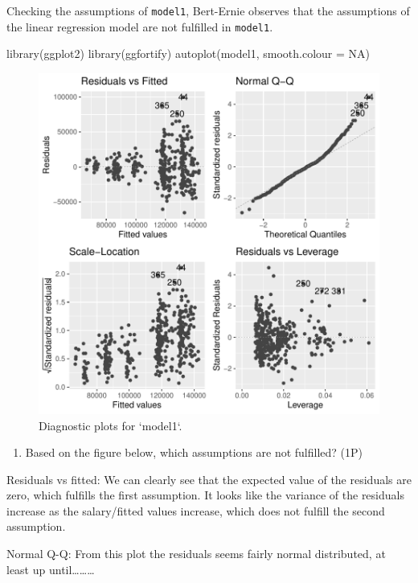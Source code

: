 \documentclass[
]{article}
\newenvironment{Shaded}{\begin{snugshade}}{\end{snugshade}}
\newcommand{\AttributeTok}[1]{\textcolor[rgb]{0.77,0.63,0.00}{#1}}
\newcommand{\ConstantTok}[1]{\textcolor[rgb]{0.00,0.00,0.00}{#1}}
\newcommand{\FunctionTok}[1]{\textcolor[rgb]{0.00,0.00,0.00}{#1}}
\newcommand{\NormalTok}[1]{#1}
\providecommand{\tightlist}{%
  \setlength{\itemsep}{0pt}\setlength{\parskip}{0pt}}
\begin{document}
Checking the assumptions of \texttt{model1}, Bert-Ernie observes that
the assumptions of the linear regression model are not fulfilled in
\texttt{model1}.

\begin{Shaded}
\begin{Highlighting}[]
\FunctionTok{library}\NormalTok{(ggplot2)}
\FunctionTok{library}\NormalTok{(ggfortify)}
\FunctionTok{autoplot}\NormalTok{(model1, }\AttributeTok{smooth.colour =} \ConstantTok{NA}\NormalTok{)}
\end{Highlighting}
\end{Shaded}

\begin{figure}

{\centering \includegraphics[width=0.6\linewidth]{compulsory_files/figure-latex/fig_model_check-1} 

}

\caption{Diagnostic plots for `model1`.}\label{fig:fig_model_check}
\end{figure}

\begin{enumerate}
\def\labelenumi{\roman{enumi})}
\tightlist
\item
  Based on the figure below, which assumptions are not fulfilled? (1P)
\end{enumerate}

Residuals vs fitted: We can clearly see that the expected value of the
residuals are zero, which fulfills the first assumption. It looks like
the variance of the residuals increase as the salary/fitted values
increase, which does not fulfill the second assumption.

Normal Q-Q: From this plot the residuals seems fairly normal
distributed, at least up until\ldots\ldots\ldots{}
\end{document}
